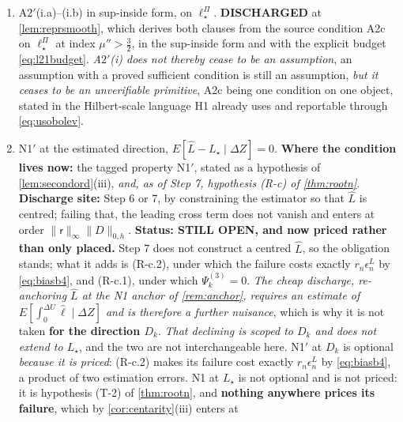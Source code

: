 \begin{remark}
\begin{enumerate}
\item[(O1)] A$2'$(i.a)--(i.b) in sup-inside form, on $\ell^\Pi_\star$. \textbf{DISCHARGED} at
\cref{lem:reprsmooth}, which derives both clauses from the
source condition A2c on $\ell^\Pi_\star$ at index $\mu''>\tfrac32$, in the sup-inside form and with the
explicit budget \eqref{eq:l21budget}. \emph{A$2'$(i) does not thereby
cease to be an assumption}, an assumption with a proved sufficient condition is still an assumption, 
\emph{but it ceases to be an unverifiable primitive}, A2c being one condition on one object, stated
in the Hilbert-scale language H1 already uses and reportable through \eqref{eq:usobolev}.
\item[(O2)] N1$'$ at the estimated direction, $E[\hat L-L_\star\mid\Delta Z]=0$.
\textbf{Where the condition lives now:} the tagged property N1$'$, stated as a hypothesis of
\cref{lem:secondord}(iii), \emph{and, as of Step 7, hypothesis (R-c) of \cref{thm:rootn}}.
\textbf{Discharge site:} Step 6 or 7, by constraining the estimator so that
$\hat L$ is centred; failing that, the leading cross term does not vanish and enters at order
$\|\mathsf r\|_\infty\|D\|_{0,h}$. \textbf{Status: STILL OPEN, and now priced rather than only placed.}
Step 7 does not construct a centred $\hat L$, so the obligation stands; what it adds is (R-c.2), under which
the failure costs exactly $r_n\epsilon^{L}_n$ by \eqref{eq:biasb4}, and (R-c.1), under which
$\Psi^{(3)}_k=0$. \emph{The cheap discharge, re-anchoring $\hat L$ at the N1 anchor of
\cref{rem:anchor}, requires an estimate of $E[\int_0^{\Delta U}\hat\ell\mid\Delta Z]$ and is therefore a
further nuisance}, which is why it is not taken \textbf{for the direction $D_k$}.
\emph{That declining is scoped to $D_k$ and does not extend to $L_\star$}, and the two are not
interchangeable here. N1$'$ at $D_k$ is optional \emph{because it is priced}: (R-c.2) makes its failure
cost exactly $r_n\epsilon^{L}_n$ by \eqref{eq:biasb4}, a product of two estimation errors. N1 at
$L_\star$ is not optional and is not priced: it is hypothesis \textup{(T-2)} of \cref{thm:rootn}, and
\textbf{nothing anywhere prices its failure}, which by \cref{cor:centarity}\textup{(iii)} enters at

\end{enumerate}
\end{remark}
